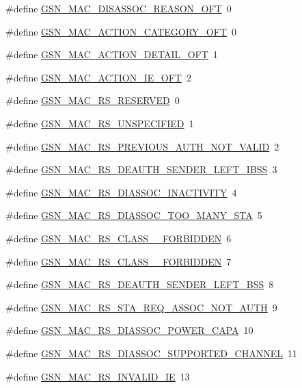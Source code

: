 \begin{DoxyCompactItemize}
\#define \hyperlink{a00523_a1f36f6cb86cbf423b8186ad41f79c916}{GSN\_\-MAC\_\-DISASSOC\_\-REASON\_\-OFT}~0
\item 
\#define \hyperlink{a00523_a5a4e023b60dea0070ada3323f21b12a2}{GSN\_\-MAC\_\-ACTION\_\-CATEGORY\_\-OFT}~0
\item 
\#define \hyperlink{a00523_aa5483a646f5fc726adde5a07b59c640f}{GSN\_\-MAC\_\-ACTION\_\-DETAIL\_\-OFT}~1
\item 
\#define \hyperlink{a00523_aa66f583ed8af2f875698990f01c4de6a}{GSN\_\-MAC\_\-ACTION\_\-IE\_\-OFT}~2
\item 
\#define \hyperlink{a00523_ae4ae037b447de8e12b10f58f9c3e9263}{GSN\_\-MAC\_\-RS\_\-RESERVED}~0
\item 
\#define \hyperlink{a00523_a99dfe6e89903612c57237c114846f4ff}{GSN\_\-MAC\_\-RS\_\-UNSPECIFIED}~1
\item 
\#define \hyperlink{a00523_a3566113862cc56e6a6103a8f414c708e}{GSN\_\-MAC\_\-RS\_\-PREVIOUS\_\-AUTH\_\-NOT\_\-VALID}~2
\item 
\#define \hyperlink{a00523_a930fe30b1b283cd075f17ef7f1cc2e47}{GSN\_\-MAC\_\-RS\_\-DEAUTH\_\-SENDER\_\-LEFT\_\-IBSS}~3
\item 
\#define \hyperlink{a00523_a6f0d521a443347ca81da2328f25ce088}{GSN\_\-MAC\_\-RS\_\-DIASSOC\_\-INACTIVITY}~4
\item 
\#define \hyperlink{a00523_a974ade1d8827f6ba234e497ed652df62}{GSN\_\-MAC\_\-RS\_\-DIASSOC\_\-TOO\_\-MANY\_\-STA}~5
\item 
\#define \hyperlink{a00523_aaac8115c78e3583af8aaf3a0f399b57b}{GSN\_\-MAC\_\-RS\_\-CLASS\_\_\-FORBIDDEN}~6
\item 
\#define \hyperlink{a00523_a1c83e5f5fa3adf4a37c35475d83d5d29}{GSN\_\-MAC\_\-RS\_\-CLASS\_\_\-FORBIDDEN}~7
\item 
\#define \hyperlink{a00523_a3de22c5fe875d0b9ead9fe623ba6d1ff}{GSN\_\-MAC\_\-RS\_\-DEAUTH\_\-SENDER\_\-LEFT\_\-BSS}~8
\item 
\#define \hyperlink{a00523_a991360dfc5569fca86b361314d292f0b}{GSN\_\-MAC\_\-RS\_\-STA\_\-REQ\_\-ASSOC\_\-NOT\_\-AUTH}~9
\item 
\#define \hyperlink{a00523_a2d03e2683024e652ed4e9e5211a9c668}{GSN\_\-MAC\_\-RS\_\-DIASSOC\_\-POWER\_\-CAPA}~10
\item 
\#define \hyperlink{a00523_af687a8666ac11fa3a97bd5024daeb4bc}{GSN\_\-MAC\_\-RS\_\-DIASSOC\_\-SUPPORTED\_\-CHANNEL}~11
\item 
\#define \hyperlink{a00523_a13d95fbfc69f83f6ad1ff6610b0d1ca8}{GSN\_\-MAC\_\-RS\_\-INVALID\_\-IE}~13
\item 

\end{DoxyCompactItemize}
